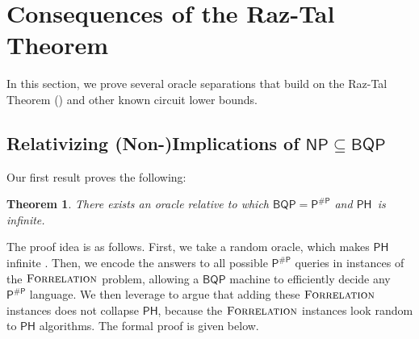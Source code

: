 \documentclass[10pt,a4paper]{article}
\newtheorem{theorem}{Theorem}
\newcommand{\Forrelation}{\normalfont\textsc{Forrelation}}
\begin{document}
\section{Consequences of the Raz-Tal Theorem}

In this section, we prove several oracle separations that build on the Raz-Tal Theorem () and other known circuit lower bounds.

\subsection{Relativizing (Non-)Implications of \texorpdfstring{$\mathsf{NP}\subseteq\mathsf{BQP}$}{NP in BQP}}

Our first result proves the following:


\begin{theorem}
\label{thm:bqp=pp_ph_infinite}
There exists an oracle relative to which $\mathsf{BQP} = \mathsf{P^{\# P}}$ and $\mathsf{PH}$\ is infinite.
\end{theorem}


The proof idea is as follows. First, we take a random oracle, which makes $\mathsf{PH}$ infinite \cite{HRST17,RST15}. Then, we encode the answers to all possible $\mathsf{P^{\# P}}$ queries in instances of the $\Forrelation$ problem, allowing a $\mathsf{BQP}$ machine to efficiently decide any $\mathsf{P^{\# P}}$ language. We then leverage  to argue that adding these $\Forrelation$ instances does not collapse $\mathsf{PH}$, because the $\Forrelation$ instances look random to $\mathsf{PH}$ algorithms. The formal proof is given below.
\end{document}
